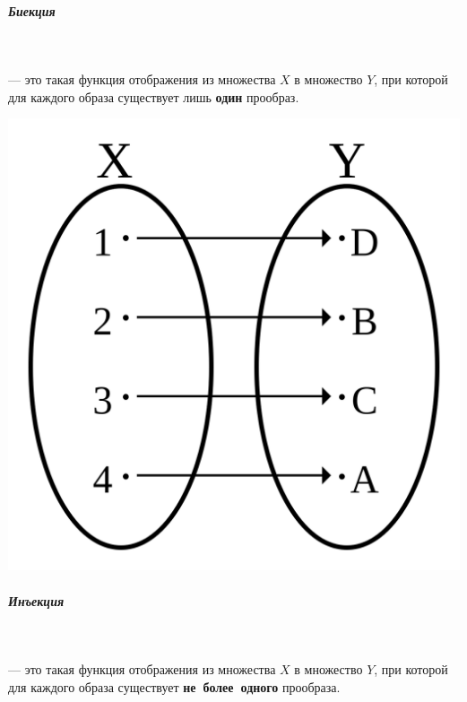 \documentclass[12pt, a4]{article}
\begin{document}
\subparagraph{Биекция}\mbox{}\\
\begin{minipage}{0.1\textwidth}
\end{minipage}
\hspace{0.5cm}
\begin{minipage}{0.6\textwidth}
	--- это такая функция отображения из множества $X$ в множество $Y$, при которой для каждого образа существует лишь \textbf{один} прообраз.
\end{minipage}
\hfill
\begin{minipage}{0.3\textwidth}
	\includegraphics[scale=0.075]{biekcia}
\end{minipage}
\subparagraph{Инъекция}\mbox{}\\
\begin{minipage}{0.1\textwidth}
\end{minipage}
\hspace{0.5cm}
\begin{minipage}{0.6\textwidth}
	--- это такая функция отображения из множества $X$ в множество $Y$, при которой для каждого образа существует \textbf{не~более~одного} прообраза.
\end{minipage}
\hfill
\end{document}

